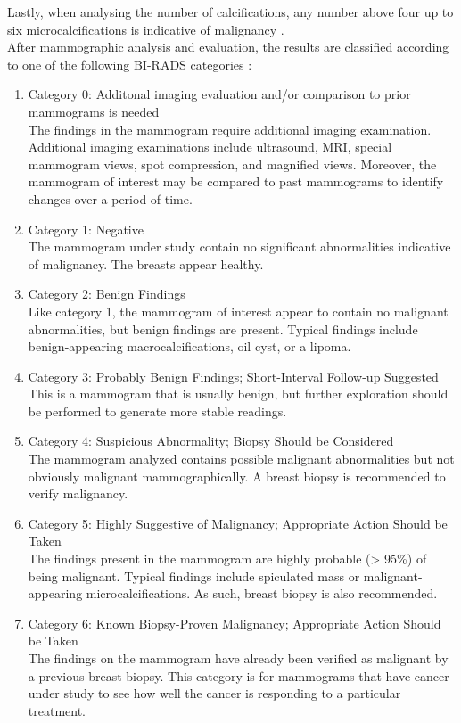 	Lastly, when analysing the number of calcifications, any number above four up to six microcalcifications is indicative of malignancy \cite{mammaryCalcifications}. \\

	After mammographic analysis and evaluation, the results are classified according to one of the following BI-RADS categories \cite{breastCancerScreeningAndDiagnosis}:

\begin{enumerate}
	\item{Category 0: Additonal imaging evaluation and/or comparison to prior mammograms is needed} \\
	The findings in the mammogram require additional imaging examination. Additional imaging examinations include ultrasound, MRI, special mammogram views, spot compression, and magnified views. Moreover, the mammogram of interest may be compared to past mammograms to identify changes over a period of time.

	\item{Category 1: Negative} \\
	The mammogram under study contain no significant abnormalities indicative of malignancy. The breasts appear healthy.

	\item{Category 2: Benign Findings} \\
	Like category 1, the mammogram of interest appear to contain no malignant abnormalities, but benign findings are present. Typical findings include benign-appearing macrocalcifications, oil cyst, or a lipoma.

	\item{Category 3: Probably Benign Findings; Short-Interval Follow-up Suggested} \\
	This is a mammogram that is usually benign, but further exploration should be performed to generate more stable readings.

	\item{Category 4: Suspicious Abnormality; Biopsy Should be Considered} \\
	The mammogram analyzed contains possible malignant abnormalities but not obviously malignant mammographically. A breast biopsy is recommended to verify malignancy.

	\item{Category 5: Highly Suggestive of Malignancy; Appropriate Action Should be Taken} \\
	The findings present in the mammogram are highly probable (> 95\%) of being malignant. Typical findings include spiculated mass or malignant-appearing microcalcifications. As such, breast biopsy is also recommended.

	\item{Category 6: Known Biopsy-Proven Malignancy; Appropriate Action Should be Taken} \\
	The findings on the mammogram have already been verified as malignant by a previous breast biopsy. This category is for mammograms that have cancer under study to see how well the cancer is responding to a particular treatment.
\end{enumerate}

